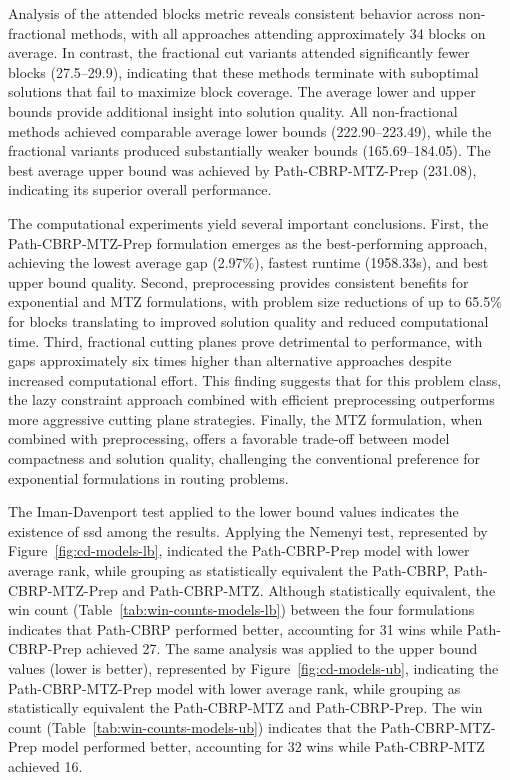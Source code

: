 Analysis of the attended blocks metric reveals consistent behavior across non-fractional methods, with all approaches attending approximately 34 blocks on average. In contrast, the fractional cut variants attended significantly fewer blocks (27.5--29.9), indicating that these methods terminate with suboptimal solutions that fail to maximize block coverage. The average lower and upper bounds provide additional insight into solution quality. All non-fractional methods achieved comparable average lower bounds (222.90--223.49), while the fractional variants produced substantially weaker bounds (165.69--184.05). The best average upper bound was achieved by Path-CBRP-MTZ-Prep (231.08), indicating its superior overall performance.

The computational experiments yield several important conclusions. First, the Path-CBRP-MTZ-Prep formulation emerges as the best-performing approach, achieving the lowest average gap (2.97\%), fastest runtime (1958.33s), and best upper bound quality. Second, preprocessing provides consistent benefits for exponential and MTZ formulations, with problem size reductions of up to 65.5\% for blocks translating to improved solution quality and reduced computational time. Third, fractional cutting planes prove detrimental to performance, with gaps approximately six times higher than alternative approaches despite increased computational effort. This finding suggests that for this problem class, the lazy constraint approach combined with efficient preprocessing outperforms more aggressive cutting plane strategies. Finally, the MTZ formulation, when combined with preprocessing, offers a favorable trade-off between model compactness and solution quality, challenging the conventional preference for exponential formulations in routing problems.

The  Iman-Davenport  test  applied  to  the lower  bound  values  indicates  the existence of \gls{ssd} among the results.
Applying the Nemenyi test, represented by Figure~\ref{fig:cd-models-lb}, indicated the {Path-CBRP-Prep} model with lower average rank, while grouping as statistically equivalent the Path-CBRP, Path-CBRP-MTZ-Prep and Path-CBRP-MTZ. Although statistically equivalent, the win count (Table~\ref{tab:win-counts-models-lb}) between the four formulations indicates that {Path-CBRP} performed better, accounting for 31 wins while {Path-CBRP-Prep} achieved 27.
The same analysis was applied to the upper bound values (lower is better), represented by Figure~\ref{fig:cd-models-ub}, indicating the {Path-CBRP-MTZ-Prep} model with lower average rank, while grouping as statistically equivalent the {Path-CBRP-MTZ} and {Path-CBRP-Prep}. The win count (Table~\ref{tab:win-counts-models-ub}) indicates that the {Path-CBRP-MTZ-Prep} model performed better, accounting for 32 wins while {Path-CBRP-MTZ} achieved 16.


